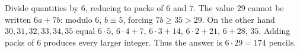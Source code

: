 Divide quantities by $6$, reducing to packs of $6$ and $7$. The value $29$ cannot be written $6a+7b$: modulo $6$, $b\equiv5$, forcing $7b\ge35>29$. On the other hand $30,31,32,33,34,35$ equal $6\cdot5$, $6\cdot4+7$, $6\cdot3+14$, $6\cdot2+21$, $6+28$, $35$. Adding packs of $6$ produces every larger integer. Thus the answer is $6\cdot29=\boxed{174}$ pencils.
